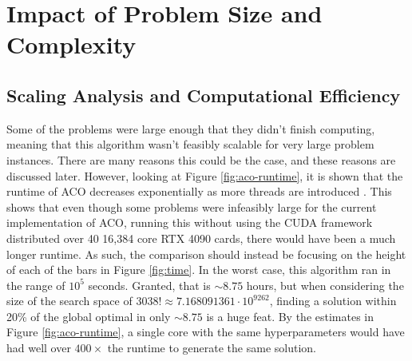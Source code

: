 \documentclass[11pt]{report}
\begin{document}
            \newpage
    \section{Impact of Problem Size and Complexity}

        \subsection{Scaling Analysis and Computational Efficiency}
            \noindent Some of the problems were large enough that they didn't finish computing, meaning that this algorithm wasn't feasibly scalable for very large problem instances. There are many reasons this could be the case, and these reasons are discussed later. However, looking at Figure \ref{fig:aco-runtime}, it is shown that the runtime of ACO decreases exponentially as more threads are introduced \cite{borisenko2019}. This shows that even though some problems were infeasibly large for the current implementation of ACO, running this without using the CUDA framework distributed over 40 16,384 core RTX 4090 cards, there would have been a much longer runtime. As such, the comparison should instead be focusing on the height of each of the bars in Figure \ref{fig:time}. In the worst case, this algorithm ran in the range of $10^5$ seconds. Granted, that is $\sim8.75$ hours, but when considering the size of the search space of $3038! \approx 7.168091361\cdot10^{9262}$, finding a solution within 20\% of the global optimal in only $\sim8.75$ is a huge feat. By the estimates in Figure \ref{fig:aco-runtime}, a single core with the same hyperparameters would have had well over $400\times$ the runtime to generate the same solution. 
            
\end{document}
